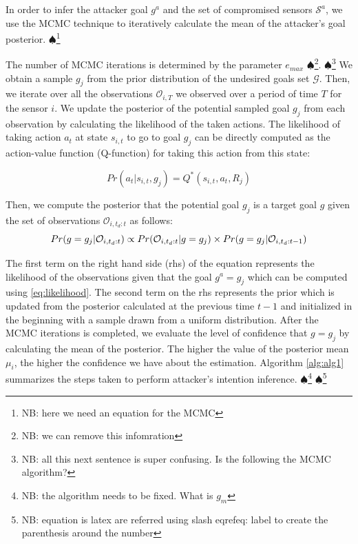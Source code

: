 \documentclass[letterpaper, 10 pt, conference]{ieeeconf}  %
\newcommand\NB[1]{$\spadesuit$\footnote{NB: #1}}
\begin{document}
In order to infer the attacker goal $g^a$ and the set of compromised sensors $\mathcal{S}^a$, we use the MCMC technique to iteratively calculate the mean of the attacker's goal posterior. \NB{here we need an equation for the MCMC}

The number of MCMC iterations is determined by the parameter ${e}_{max}$ \NB{we can remove this infomration}. \NB{all this next sentence is super confusing. Is the following the MCMC algorithm? } We obtain a sample $g_j$ from the prior distribution of the undesired goals set $\mathcal{G}$. Then, we iterate over all the observations $\mathcal{O}_{i,T}$ we observed over a period of time $T$ for the sensor $i$. We update the posterior of the potential sampled goal $g_j$ from each observation by calculating the likelihood of the taken actions. The likelihood of taking action $a_t$ at state $s_{i,t}$ to go to goal $g_j$ can be directly computed as the action-value function (Q-function) for taking this action from this state:

\begin{equation} Pr(a_t|s_{i,t},g_j) = Q^*(s_{i,t},a_t,R_j)
\label{eqn:action_likelihood}
\end{equation}


Then, we compute the posterior that the potential goal $g_j$ is a target goal $g$ given the set of observations $\mathcal{O}_{i,t_d:t}$ as follows:
\begin{equation} Pr(g=g_j|\mathcal{O}_{i,t_d:t}) \propto Pr(\mathcal{O}_{i,t_d:t} | g = g_j) \\ \times Pr(g=g_j|\mathcal{O}_{i,t_d:t-1})
\label{eqn:goal_posterior}
\end{equation}

The first term on the right hand side (rhs) of the equation represents the likelihood of the observations given that the goal $g^a=g_j$ which can be computed using \eqref{eq:likelihood}. The second term on the rhs represents the prior which is updated from the posterior calculated at the previous time $t-1$ and initialized in the beginning with a sample drawn from a uniform distribution.
After the MCMC iterations is completed, we evaluate the level of confidence that $g = g_j$ by calculating the mean of the posterior. The higher the value of the posterior mean $\mu_i$, the higher the confidence we have about the estimation. Algorithm \ref{alg:alg1} summarizes the steps taken to perform attacker's intention inference. \NB{the algorithm needs to be fixed. What is $g_m$}
\NB{equation is latex are referred using slash eqref{eq: label} to create the parenthesis around the number }
\end{document}
